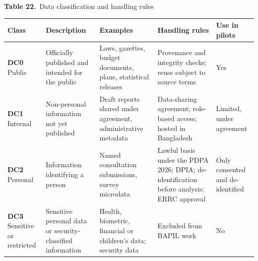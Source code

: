 \documentclass[border=10pt]{standalone}
\begin{document}
\begin{minipage}{17cm}
{\large\bfseries Table 22.}\ {\large Data classification and handling rules}\par\vspace{7pt}
\small
{}
\begin{tabularx}{\linewidth}{@{}>{\hsize=0.693\hsize\raggedright\arraybackslash}X>{\hsize=0.990\hsize\raggedright\arraybackslash}X>{\hsize=1.188\hsize\raggedright\arraybackslash}X>{\hsize=1.386\hsize\raggedright\arraybackslash}X>{\hsize=0.743\hsize\raggedright\arraybackslash}X@{}}
\arrayrulecolor{bapilrule}\toprule
\rowcolor{white}\textbf{Class} & \textbf{Description} & \textbf{Examples} & \textbf{Handling rules} & \textbf{Use in pilots} \\
\midrule
\textbf{DC0} Public & Officially published and intended for the public & Laws, gazettes, budget documents, plans, statistical releases & Provenance and integrity checks; reuse subject to source terms & Yes \\
\textbf{DC1} Internal & Non-personal information not yet published & Draft reports shared under agreement, administrative metadata & Data-sharing agreement; role-based access; hosted in Bangladesh & Limited, under agreement \\
\textbf{DC2} Personal & Information identifying a person & Named consultation submissions, survey microdata & Lawful basis under the PDPA 2026; DPIA; de-identification before analysis; ERRC approval & Only consented and de-identified \\
\textbf{DC3} Sensitive or restricted & Sensitive personal data or security-classified information & Health, biometric, financial or children’s data; security data & Excluded from BAPIL work & No \\
\bottomrule
\end{tabularx}
\par{}
\end{minipage}
\end{document}
